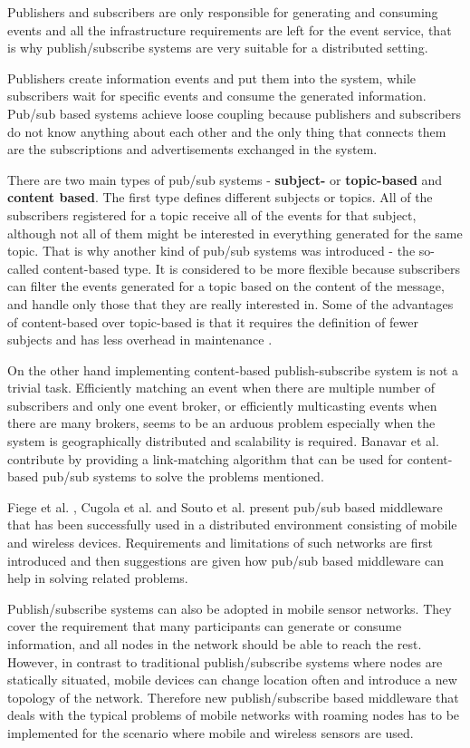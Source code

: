 \documentclass{sigplanconf}
\begin{document}
Publishers and subscribers are only responsible for generating and consuming events and all the infrastructure requirements are left for the event service, that is why publish/subscribe systems are very suitable for a distributed setting.

Publishers create information events and put them into the system, while subscribers wait for specific events and consume the generated information. Pub/sub based systems achieve loose coupling because publishers and subscribers do not know anything about each other and the only thing that connects them are the subscriptions and advertisements exchanged in the system.

There are two main types of pub/sub systems - \textbf{subject-} or \textbf{topic-based} and \textbf{content based}. The first type defines different subjects or topics. All of the subscribers registered for a topic receive all of the events for that subject, although not all of them might be interested in everything generated for the same topic. That is why another kind of pub/sub systems was introduced - the so-called content-based type. It is considered to be more flexible because subscribers can filter the events generated for a topic based on the content of the message, and handle only those that they are really interested in. Some of the advantages of content-based over topic-based is that it requires the definition of fewer subjects and has less overhead in maintenance \cite{pubsuburl}.

On the other hand implementing content-based publish-subscribe system is not a trivial task. Efficiently matching an event when there are multiple number of subscribers and only one event broker, or efficiently multicasting events when there are many brokers, seems to be an arduous problem especially when the system is geographically distributed and scalability is required. Banavar et al. \cite{pubsub1} contribute by providing a link-matching algorithm that can be used for content-based pub/sub systems to solve the problems mentioned.

Fiege et al. \cite{pubsub2}, Cugola et al. \cite{pubsub3} and Souto et al. \cite{pubsub5} present pub/sub based middleware that has been successfully used in a distributed environment consisting of mobile and wireless devices. Requirements and limitations of such networks are first introduced and then suggestions are given how pub/sub based middleware can help in solving related problems.

Publish/subscribe systems can also be adopted in mobile sensor networks. They cover the requirement that many participants can generate or consume information, and all nodes in the network should be able to reach the rest. However, in contrast to traditional publish/subscribe systems where nodes are statically situated, mobile devices can change location often and introduce a new topology of the network. Therefore new publish/subscribe based middleware that deals with the typical problems of mobile networks with roaming nodes has to be implemented for the scenario where mobile and wireless sensors are used.
\end{document}
